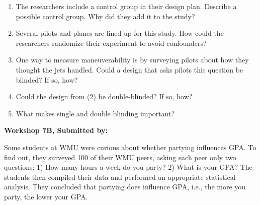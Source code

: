\documentclass[11pt, chapterprefix=true]{scrbook}\usepackage[]{graphicx}\usepackage[]{color}
\begin{document}
\begin{exercises}
\begin{exercise}
\begin{enumerate}
  \item The researchers include a control group in their design plan. Describe a possible control group. Why did they add it to the study?
  \item Several pilots and planes are lined up for this study. How could the researchers randomize their experiment to avoid confounders?
  \item One way to measure maneuverability is by surveying pilots about how they thought the jets handled. Could a design that asks pilots this question be blinded? If so, how?
  \item Could the design from (2) be double-blinded? If so, how?
  \item What makes single and double blinding important?
\end{enumerate}
\end{exercise}
\begin{solution}  %

\end{solution}

\clearpage

    \begin{exercise}  %

    \begin{center}
\begin{flushleft}\textbf{\large \hfill Workshop 7B, Submitted by: }\end{flushleft}

\end{center}

Some students at WMU were curious about whether partying influences GPA. To find out, they surveyed 100 of their WMU peers, asking each peer only two questions: 1) How many hours a week do you party? 2) What is your GPA? The students then compiled their data and performed an appropriate statistical analysis. They concluded that partying does influence GPA, i.e., the more you party, the lower your GPA.


\end{exercise}
\end{exercises}
\end{document}
